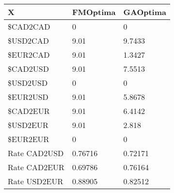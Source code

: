 \begin{tabular}{lll}
X & FMOptima & GAOptima \\ 
\hline 
\$CAD2CAD & 0 & 0 \\ 
\$USD2CAD & 9.01 & 9.7433 \\ 
\$EUR2CAD & 9.01 & 1.3427 \\ 
\$CAD2USD & 9.01 & 7.5513 \\ 
\$USD2USD & 0 & 0 \\ 
\$EUR2USD & 9.01 & 5.8678 \\ 
\$CAD2EUR & 9.01 & 6.4142 \\ 
\$USD2EUR & 9.01 & 2.818 \\ 
\$EUR2EUR & 0 & 0 \\ 
Rate CAD2USD & 0.76716 & 0.72171 \\ 
Rate CAD2EUR & 0.69786 & 0.76164 \\ 
Rate USD2EUR & 0.88905 & 0.82512 \\ 
\hline 
\end{tabular}